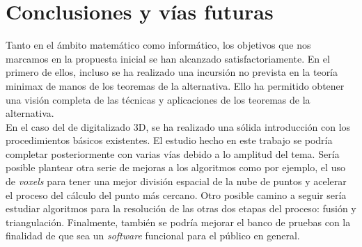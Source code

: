 \chapter{Conclusiones y vías futuras}
Tanto en el ámbito matemático como informático, los objetivos que nos marcamos en la propuesta inicial se han alcanzado satisfactoriamente. En el primero de ellos, incluso se ha realizado una incursión no prevista en la teoría minimax de manos de los teoremas de la alternativa. Ello ha permitido obtener una visión completa de las técnicas y aplicaciones de los teoremas de la alternativa. \\

En el caso del de digitalizado 3D, se ha realizado una sólida introducción con los procedimientos básicos existentes. El estudio hecho en este trabajo se podría completar posteriormente con varias vías debido a lo amplitud del tema. Sería posible plantear otra serie de mejoras a los algoritmos como por ejemplo, el uso de \textit{voxels} para tener una mejor división espacial de la nube de puntos y acelerar el proceso del cálculo del punto más cercano. Otro posible camino a seguir sería estudiar algoritmos para la resolución de las otras dos etapas del proceso: fusión y triangulación. Finalmente, también se podría mejorar el banco de pruebas con la finalidad de que sea un \textit{software} funcional para el público en general.